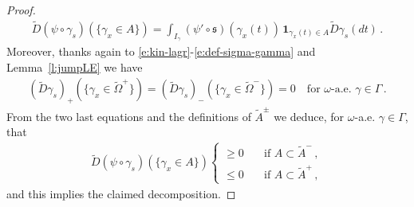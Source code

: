 \documentclass[10pt,a4paper]{amsart}
\begin{document}
\begin{proof}
\begin{align*}
\tilde D(\psi\circ \gamma_s)(\lbrace \gamma_x\in A\rbrace)
= 
\int_{I_\gamma} (\psi'\circ \mathfrak s) (\gamma_x(t))\,
\mathbf 1_{\gamma_x(t)\in A} 
\tilde D\gamma_s(dt)\,.
\end{align*}
Moreover, thanks again to \eqref{e:kin-lagr}-\eqref{e:def-sigma-gamma} and Lemma~\ref{l:jumpLE} we have
\begin{align*}
(\tilde D\gamma_s)_+(\{\gamma_x \in \tilde\Omega^+\})=(\tilde D\gamma_s)_-(\{ \gamma_x \in \tilde\Omega^-\})=0\quad\text{for }\omega\text{-a.e. }\gamma\in\Gamma\,.
\end{align*}
From the two last equations and the definitions of $\tilde A^\pm$ we deduce, for $\omega$-a.e. $\gamma\in\Gamma$, that
\begin{align*}
\tilde D(\psi\circ \gamma_s)(\lbrace \gamma_x\in A\rbrace)
\begin{cases}
\geq 0\quad
&\text{if }A\subset \tilde A^-\,,
\\
\leq 0\quad
&\text{if }A\subset \tilde A^+\,,
\end{cases}
\end{align*}
and this implies the claimed decomposition.
\end{proof}
\end{document}
